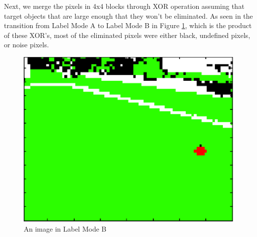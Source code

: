 \documentclass{article}
\begin{document}
     	\begin{figure}[H]
		    \centering
    		\quad
    		\quad
        \caption{}
    	\end{figure}

    	Next, we merge the pixels in 4x4 blocks through XOR operation assuming that target objects that are large enough that they won't be eliminated. As seen in the transition from Label Mode A to Label Mode B in Figure \ref{fig:labelb}, which is the product of these XOR's, most of the eliminated pixels were either black, undefined pixels, or noise pixels.
  
      \begin{figure}[H]
		    \centering
    		\includegraphics[width=.5\textwidth]{figures/LabelB.eps}
		    \caption{An image in Label Mode B}
    		\label{fig:labelb}
	    \end{figure}
  
\end{document}
